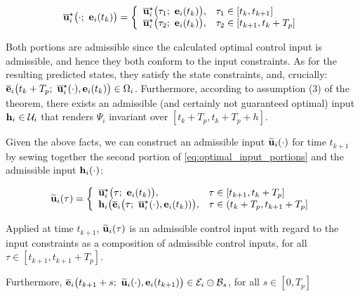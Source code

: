 \begin{equation}
  \overline{\vect{u}}_i^{\star}\big(\cdot;\ \vect{e}_i(t_k)\big) = \left\{
      \begin{array}{ll}
        \overline{\vect{u}}_i^{\star}\big(\tau_1;\ \vect{e}_i(t_k)\big), & \tau_1 \in [t_k, t_{k+1}] \\
        \overline{\vect{u}}_i^{\star}\big(\tau_2;\ \vect{e}_i(t_k)\big), & \tau_2 \in [t_{k+1}, t_k + T_p]
      \end{array}
      \right.
  \label{eq:optimal_input_portions}
\end{equation}

Both portions are admissible since the calculated optimal control input is
admissible, and hence they both conform to the input constraints.
As for the resulting predicted states, they satisfy the state constraints, and,
crucially: $\overline{\vect{e}}_i\big(t_k + T_p;\ \overline{\vect{u}}_i^{\star}(\cdot), \vect{e}_i(t_k)\big) \in \Omega_i$.
Furthermore, according to assumption (3) of the theorem, there exists an
admissible (and certainly not guaranteed optimal) input
$\bm{\mathbf{h}}_i \in \mathcal{U}_i$ that renders $\Psi_i$ invariant
over $[t_k + T_p, t_k + T_p + h]$.

Given the above facts, we can construct an admissible input
$\widetilde{\bm{\mathbf{u}}}_i(\cdot)$  for time $t_{k+1}$ by sewing together the second
portion of \eqref{eq:optimal_input_portions} and the admissible input
$\bm{\mathbf{h}}_i(\cdot)$:

\begin{equation}
  \widetilde{\vect{u}}_i(\tau) = \left\{
      \begin{array}{ll}
        \overline{\vect{u}}_i^{\star}\big(\tau;\ \vect{e}_i(t_k)\big), & \tau \in [t_{k+1}, t_k + T_p] \\
        \vect{h}_i\big(\overline{\vect{e}}_i\big(\tau;\ \overline{\vect{u}}_i^{\star}(\cdot), \vect{e}_i(t_k))\big), & \tau \in (t_k + T_p, t_{k+1} + T_p]
      \end{array}
      \right.
\label{eq:optimal_input_t_plus_one}
\end{equation}

Applied at time $t_{k+1}$, $\widetilde{\bm{\mathbf{u}}}_i(\tau)$
is an admissible control input with regard to the input constraints as
a composition of admissible control inputs, for
all $\tau \in [t_{k+1}, t_{k+1} + T_p]$.


Furthermore, $\overline{\vect{e}}_i\big(t_{k+1} + s;\ \widetilde{\vect{u}}_i(\cdot), \vect{e}_i(t_{k+1})\big) \in \mathcal{E}_i \ominus \mathcal{B}_{s}$,
for all $s \in [0,  T_p]$


